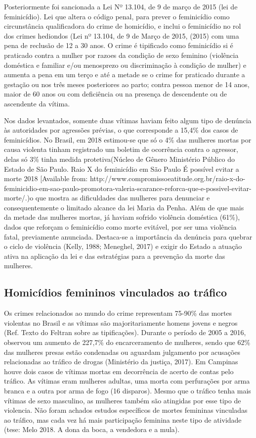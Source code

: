 Posteriormente foi sancionada a Lei Nº 13.104, de 9 de março de 2015 (lei de feminicídio). Lei que altera o código penal, para prever o feminicídio como circunstância qualificadora do crime de homicídio, e inclui o feminicídio no rol dos crimes hediondos (Lei nº 13.104, de 9 de Março de 2015, (2015) com uma pena de reclusão de 12 a 30 anos. O crime é tipificado como feminicídio si é praticado contra a mulher por razoes da condição de sexo feminino (violência doméstica e familiar e/ou menosprezo ou discriminação à condição de mulher) e aumenta a pena em um terço e até a metade se o crime for praticado durante a gestação ou nos três meses posteriores ao parto; contra pessoa menor de 14 anos, maior de 60 anos ou com deficiência ou na presença de descendente ou de ascendente da vítima. 

Nos dados levantados, somente duas vítimas haviam feito algum tipo de denúncia às autoridades por agressões prévias, o que corresponde a 15,4\% dos casos de feminicídios. No Brasil, em 2018 estimou-se que só o 4\% das mulheres mortas por causa violenta tinham registrado um boletim de ocorrência contra o agressor, delas só 3\% tinha medida protetiva(Núcleo de Gênero Ministério Público do Estado de São Paulo. Raio X do feminicídio em São Paulo  É possível evitar a morte   2018 [Available from: http://www.compromissoeatitude.org.br/raio-x-do-feminicidio-em-sao-paulo-promotora-valeria-scarance-reforca-que-e-possivel-evitar-morte/.)o que mostra as dificuldades das mulheres para denunciar e consequentemente o limitado alcance da lei Maria da Penha. Além de que mais da metade das mulheres mortas, já haviam sofrido violência doméstica (61\%), dados que reforçam o feminicídio como morte evitável, por ser uma violência fatal, previamente anunciada. Destaca-se a importância da denúncia para quebrar o ciclo de violência (Kelly, 1988; Meneghel, 2017) e exigir do Estado a atuação ativa na aplicação da lei e das estratégias para a prevenção da morte das mulheres.

\subsection{Homicídios femininos vinculados ao tráfico} 

Os crimes relacionados ao mundo do crime representam 75-90\% das mortes violentas no Brasil e as vítimas são majoritariamente homens jovens e negros (Ref. Texto do Feltran sobre as tipificações). Durante o período de 2005 a 2016, observou um aumento de 227,7\% do encarceramento de mulheres, sendo que 62\% das mulheres presas estão condenadas ou aguardam julgamento por acusações relacionadas ao tráfico de drogas (Ministério da justiça, 2017). Em Campinas houve dois casos de vítimas mortas em decorrência de acerto de contas pelo tráfico. As vítimas eram mulheres adultas, uma morta com perfurações por arma branca e a outra por arma de fogo (16 disparos). Mesmo que o tráfico tenha mais vítimas de sexo masculino, as mulheres também são atingidas por esse tipo de violencia. Não foram achados estudos específicos de mortes femininas vinculadas ao tráfico, mas cada vez há mais participação feminina neste tipo de atividade (tese: Melo 2018. A dona da boca, a vendedora e a mula).

